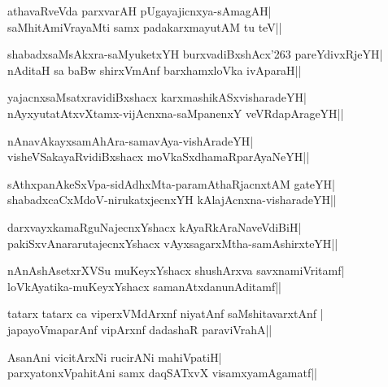 \begin{shloka}
athavaRveVda parxvarAH pUgayajicnxya-sAmagAH|\\
saMhitAmiVrayaMti samx padakarxmayutAM tu teV||
\end{shloka}

\begin{shloka}
shabadxsaMsAkxra-saMyuketxYH burxvadiBxshAcx\char'263 pareYdivxRjeYH|\\
nAditaH sa baBw shirxVmAnf barxhamxloVka ivAparaH||
\end{shloka}

\begin{shloka}
yajacnxsaMsatxravidiBxshacx karxmashikASxvisharadeYH|\\
nAyxyutatAtxvXtamx-vijAcnxna-saMpanenxY veVRdapArageYH||
\end{shloka}

\begin{shloka}
nAnavAkayxsamAhAra-samavAya-vishAradeYH|\\
visheVSakayaRvidiBxshacx moVkaSxdhamaRparAyaNeYH||
\end{shloka}

\begin{shloka}
sAthxpanAkeSxVpa-sidAdhxMta-paramAthaRjacnxtAM gateYH|\\
shabadxcaCxMdoV-nirukatxjecnxYH kAlajAcnxna-visharadeYH||
\end{shloka}

\begin{shloka}
darxvayxkamaRguNajecnxYshacx kAyaRkAraNaveVdiBiH|\\
pakiSxvAnararutajecnxYshacx vAyxsagarxMtha-samAshirxteYH||\\
\end{shloka}

\begin{shloka}
nAnAshAsetxrXVSu muKeyxYshacx shushArxva savxnamiVritamf|\\
loVkAyatika-muKeyxYshacx samanAtxdanunAditamf||
\end{shloka}

\begin{shloka}
tatarx tatarx ca viperxVMdArxnf niyatAnf saMshitavarxtAnf |\\
japayoVmaparAnf vipArxnf dadashaR paraviVrahA||
\end{shloka}

\begin{shloka}
AsanAni vicitArxNi rucirANi mahiVpatiH|\\
parxyatonxVpahitAni samx daqSATxvX visamxyamAgamatf||
\end{shloka}

